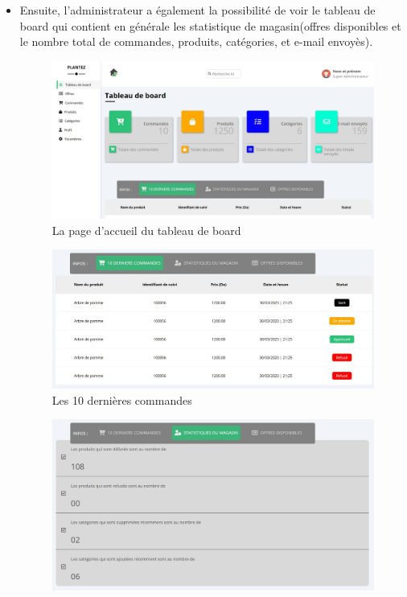\documentclass[a4paper,12pt,oneside]{article}
\begin{document}
{\begin{enumerate}
\begin{itemize}
		\item Ensuite, l’administrateur a également la possibilité de voir le tableau de board qui contient en
générale les statistique de magasin(offres disponibles et le nombre total de commandes, produits,
catégories, et e-mail envoyès).
		\begin{figure}[h]
  		\centering
  		\includegraphics[width=1\textwidth]{DASH1}
  		\caption{La page d'accueil du tableau de board}
		\end{figure}
		\newpage
		\begin{figure}[h]
  		\centering
  		\includegraphics[width=1\textwidth]{dash2}
  		\caption{Les 10 dernières commandes  }
		\end{figure}
		\begin{figure}[h]
  		\centering
  		\includegraphics[width=1\textwidth]{dash3}

\end{figure}
\end{itemize}
\end{enumerate}}
\end{document}
